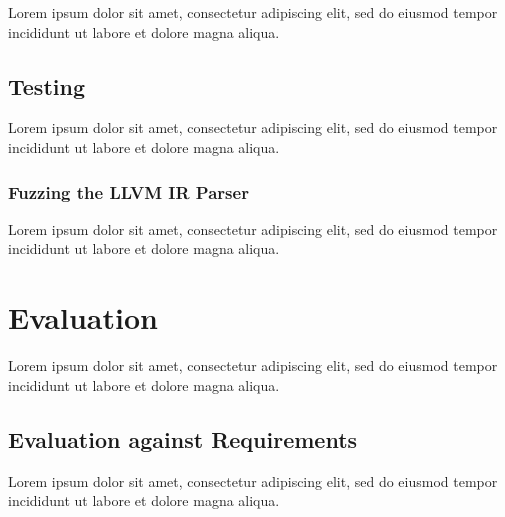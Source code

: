 \documentclass[12pt, a4paper]{article}
\begin{document}
Lorem ipsum dolor sit amet, consectetur adipiscing elit, sed do eiusmod tempor incididunt ut labore et dolore magna aliqua.


\subsection{Testing}

Lorem ipsum dolor sit amet, consectetur adipiscing elit, sed do eiusmod tempor incididunt ut labore et dolore magna aliqua.


\subsubsection{Fuzzing the LLVM IR Parser}

Lorem ipsum dolor sit amet, consectetur adipiscing elit, sed do eiusmod tempor incididunt ut labore et dolore magna aliqua.



\section{Evaluation}

Lorem ipsum dolor sit amet, consectetur adipiscing elit, sed do eiusmod tempor incididunt ut labore et dolore magna aliqua.


\subsection{Evaluation against Requirements}

Lorem ipsum dolor sit amet, consectetur adipiscing elit, sed do eiusmod tempor incididunt ut labore et dolore magna aliqua.

\end{document}
